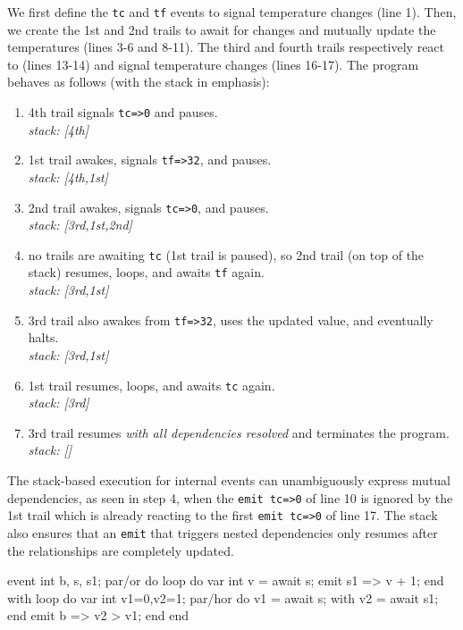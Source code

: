 \documentclass{acm_proc_article-sp}
\newcommand{\code}[1] {{\small{\texttt{#1}}}}
\newcommand{\1}{\;}
\newcommand{\2}{\;\;}
\newcommand{\3}{\;\;\;}
\newcommand{\5}{\;\;\;\;\;}
\begin{document}
We first define the \code{tc} and \code{tf} events to signal temperature 
changes (line 1).
Then, we create the 1st and 2nd trails to await for changes and mutually update 
the temperatures (lines 3-6 and 8-11).
The third and fourth trails respectively react to (lines 13-14) and signal 
temperature changes (lines 16-17).
The program behaves as follows (with the stack in emphasis):

{\small
\begin{enumerate}
\setlength{\itemsep}{0pt}
\item 4th trail signals \code{tc=>0} and pauses.\\
    \emph{stack: [4th]}
\item 1st trail awakes, signals \code{tf=>32}, and pauses.\\
    \emph{stack: [4th,1st]}
\item 2nd trail awakes, signals \code{tc=>0}, and pauses.\\
    \emph{stack: [3rd,1st,2nd]}
\item no trails are awaiting \code{tc} (1st trail is paused), so 2nd trail (on 
    top of the stack) resumes, loops, and awaits \code{tf} again.\\
    \emph{stack: [3rd,1st]}
\item 3rd trail also awakes from \code{tf=>32}, uses the updated value, and 
    eventually halts.\\
    \emph{stack: [3rd,1st]}
\item 1st trail resumes, loops, and awaits \code{tc} again.\\
    \emph{stack: [3rd]}
\item 3rd trail resumes \emph{with all dependencies resolved} and terminates 
    the program.\\
    \emph{stack: []}
\end{enumerate}
}

The stack-based execution for internal events can unambiguously express mutual 
dependencies, as seen in step 4, when the \code{emit tc=>0} of line 10 is 
ignored by the 1st trail which is already reacting to the first
\code{emit tc=>0} of line 17.
%
The stack also ensures that an \code{emit} that triggers nested dependencies 
only resumes after the relationships are completely updated.

event int b, s, s1;
par/or do
    loop do
        var int v = await s;
        emit s1 => v + 1;
    end
with
    loop do
        var int v1=0,v2=1;
        par/hor do
            v1 = await s;
        with
            v2 = await s1;
        end
        emit b => v2 > v1;
    end
end
\end{document}
